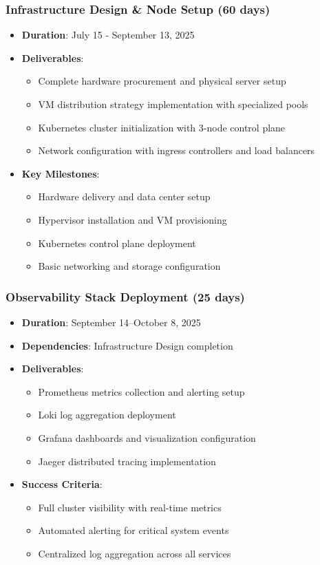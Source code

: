 \documentclass[12pt]{report}
\begin{document}
\subsubsection{Infrastructure Design \& Node Setup (60 days)}
\begin{itemize}
  \item \textbf{Duration}: July 15 - September 13, 2025
  \item \textbf{Deliverables}:
    \begin{itemize}
      \item Complete hardware procurement and physical server setup
      \item VM distribution strategy implementation with specialized pools
      \item Kubernetes cluster initialization with 3-node control plane
      \item Network configuration with ingress controllers and load balancers
    \end{itemize}
  \item \textbf{Key Milestones}:
    \begin{itemize}
      \item Hardware delivery and data center setup
      \item Hypervisor installation and VM provisioning
      \item Kubernetes control plane deployment
      \item Basic networking and storage configuration
    \end{itemize}
\end{itemize}

\subsubsection{Observability Stack Deployment (25 days)}
\begin{itemize}
  \item \textbf{Duration}: September 14--October 8, 2025
  \item \textbf{Dependencies}: Infrastructure Design completion
  \item \textbf{Deliverables}:
    \begin{itemize}
      \item Prometheus metrics collection and alerting setup
      \item Loki log aggregation deployment
      \item Grafana dashboards and visualization configuration
      \item Jaeger distributed tracing implementation
    \end{itemize}
  \item \textbf{Success Criteria}:
    \begin{itemize}
      \item Full cluster visibility with real-time metrics
      \item Automated alerting for critical system events
      \item Centralized log aggregation across all services
    \end{itemize}
\end{itemize}
\end{document}
